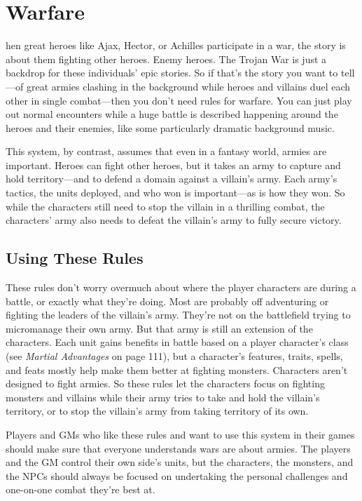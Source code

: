 \documentclass[10pt,a4paper,twoside,bg=print,twocolumn,openany,nodeprecatedcode]{dndbook}
\begin{document}
\chapter{Warfare}
hen great heroes like Ajax, Hector, or Achilles participate in a war, the story is about them fighting other heroes. Enemy heroes. The Trojan War is just a backdrop for these individuals' epic stories. So if that's the story you want to tell—of great armies clashing in the background while heroes and villains duel each other in single combat—then you don't need rules for warfare. You can just play out normal encounters while a huge battle is described happening around the heroes and their enemies, like some particularly dramatic background music.


This system, by contrast, assumes that even in a fantasy world, armies are important. Heroes can fight other heroes, but it takes an army to capture and hold territory—and to defend a domain against a villain's army. Each army's tactics, the units deployed, and who won is important—as is how they won. So while the characters still need to stop the villain in a thrilling combat, the characters' army also needs to defeat the villain's army to fully secure victory.

\section{Using These Rules}
These rules don't worry overmuch about where the player characters are during a battle, or exactly what they're doing. Most are probably off adventuring or fighting the leaders of the villain's army. They're not on the battlefield trying to micromanage their own army. But that army is still an extension of the characters. Each unit gains benefits in battle based on a player character's class (see \textit{Martial Advantages} on page 111), but a character's features, traits, spells, and feats mostly help make them better at fighting monsters. Characters aren't designed to fight armies. So these rules let the characters focus on fighting monsters and villains while their army tries to take and hold the villain's territory, or to stop the villain's army from taking territory of its own.

Players and GMs who like these rules and want to use this system in their games should make sure that everyone understands wars are about armies. The players and the GM control their own side's units, but the characters, the monsters, and the NPCs should always be focused on undertaking the personal challenges and one-on-one combat they're best at.
\end{document}

